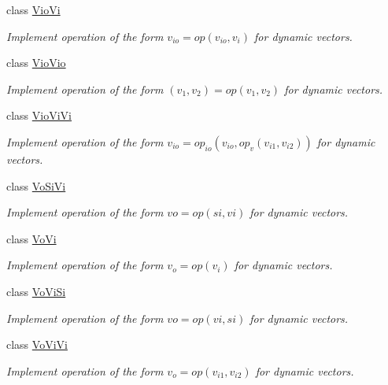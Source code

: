 \begin{DoxyCompactItemize}
class \hyperlink{classvct_dynamic_vector_loop_engines_1_1_vio_vi}{Vio\+Vi}
\begin{DoxyCompactList}\small\item\em Implement operation of the form $v_{io} = op(v_{io}, v_i)$ for dynamic vectors. \end{DoxyCompactList}\item 
class \hyperlink{classvct_dynamic_vector_loop_engines_1_1_vio_vio}{Vio\+Vio}
\begin{DoxyCompactList}\small\item\em Implement operation of the form $(v_{1}, v_{2}) = op(v_{1}, v_{2})$ for dynamic vectors. \end{DoxyCompactList}\item 
class \hyperlink{classvct_dynamic_vector_loop_engines_1_1_vio_vi_vi}{Vio\+Vi\+Vi}
\begin{DoxyCompactList}\small\item\em Implement operation of the form $v_{io} = op_{io}(v_{io}, op_{v}(v_{i1}, v_{i2}))$ for dynamic vectors. \end{DoxyCompactList}\item 
class \hyperlink{classvct_dynamic_vector_loop_engines_1_1_vo_si_vi}{Vo\+Si\+Vi}
\begin{DoxyCompactList}\small\item\em Implement operation of the form $vo = op(si, vi)$ for dynamic vectors. \end{DoxyCompactList}\item 
class \hyperlink{classvct_dynamic_vector_loop_engines_1_1_vo_vi}{Vo\+Vi}
\begin{DoxyCompactList}\small\item\em Implement operation of the form $v_o = op(v_i)$ for dynamic vectors. \end{DoxyCompactList}\item 
class \hyperlink{classvct_dynamic_vector_loop_engines_1_1_vo_vi_si}{Vo\+Vi\+Si}
\begin{DoxyCompactList}\small\item\em Implement operation of the form $vo = op(vi, si)$ for dynamic vectors. \end{DoxyCompactList}\item 
class \hyperlink{classvct_dynamic_vector_loop_engines_1_1_vo_vi_vi}{Vo\+Vi\+Vi}
\begin{DoxyCompactList}\small\item\em Implement operation of the form $v_o = op(v_{i1}, v_{i2})$ for dynamic vectors. \end{DoxyCompactList}\end{DoxyCompactItemize}
